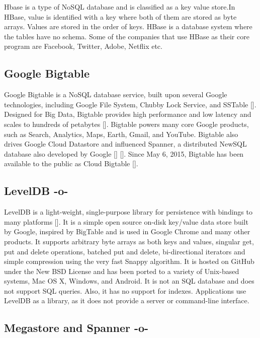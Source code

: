 Hbase is a type of NoSQL database and is classified as a key value
store.In HBase, value is identified with a key where both of them are
stored as byte arrays. Values are stored in the order of keys. HBase
is a database system where the tables have no schema. Some of the
companies that use HBase as their core program are Facebook, Twitter,
Adobe, Netflix etc.



\subsection{Google Bigtable}

Google Bigtable is a NoSQL database service, built upon several Google
technologies, including Google File System, Chubby Lock Service, and
SSTable [\cite{www-cloudbigtable}].  Designed for Big Data, Bigtable
provides high performance and low latency and scales to hundreds of
petabytes [\cite{www-cloudbigtable}]. Bigtable powers many core Google
products, such as Search, Analytics, Maps, Earth, Gmail, and
YouTube. Bigtable also drives Google Cloud Datastore and influenced
Spanner, a distributed NewSQL database also developed by Google
[\cite{www-wikispanner}] [\cite{www-wikibigtable}].  Since May 6,
2015, Bigtable has been available to the public as Cloud Bigtable
[\cite{www-wikibigtable}].

\subsection{LevelDB -o-}

LevelDB is a light-weight, single-purpose library for persistence with
bindings to many platforms [\cite{www-leveldb}]. It is a simple open
source on-disk key/value data store built by Google, inspired by
BigTable and is used in Google Chrome and many other products. It
supports arbitrary byte arrays as both keys and values, singular get,
put and delete operations, batched put and delete, bi-directional
iterators and simple compression using the very fast Snappy
algorithm. It is hosted on GitHub under the New BSD License and has
been ported to a variety of Unix-based systems, Mac OS X, Windows, and
Android. It is not an SQL database and does not support SQL
queries. Also, it has no support for indexes. Applications use LevelDB
as a library, as it does not provide a server or command-line
interface.



\subsection{Megastore and Spanner -o-}

